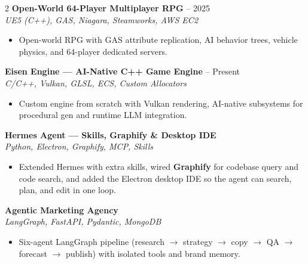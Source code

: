 \documentclass[10pt,a4paper]{article}
\begin{document}
\begin{paracol}{2}
\textbf{Open-World 64-Player Multiplayer RPG}
    \hfill {\color{subtext}\fontsize{7.5}{9} -- 2025}\\
{\fontsize{7.5}{9}\selectfont\textit{UE5 (C++), GAS, Niagara,
Steamworks, AWS EC2}}
\begin{itemize}
    \item Open-world RPG with GAS attribute replication, AI behavior
        trees, vehicle physics, and 64-player dedicated servers.
\end{itemize}

\vspace{1pt}

\textbf{Eisen Engine --- AI-Native C++ Game Engine}
    \hfill {\color{subtext}\fontsize{7.5}{9} -- Present}\\
{\fontsize{7.5}{9}\selectfont\textit{C/C++, Vulkan, GLSL, ECS,
Custom Allocators}}
\begin{itemize}
    \item Custom engine from scratch with Vulkan rendering, AI-native
        subsystems for procedural gen and runtime LLM integration.
\end{itemize}

\vspace{1pt}

\textbf{Hermes Agent --- Skills, Graphify \& Desktop IDE}
    \hfill {\color{subtext}\fontsize{7.5}{9}}\\
{\fontsize{7.5}{9}\selectfont\textit{Python, Electron, Graphify,
MCP, Skills}}
\begin{itemize}
    \item Extended Hermes with extra skills, wired \textbf{Graphify}
        for codebase query and code search, and added the Electron
        desktop IDE so the agent can search, plan, and edit in one loop.
\end{itemize}

\vspace{1pt}

\textbf{Agentic Marketing Agency}
    \hfill {\color{subtext}\fontsize{7.5}{9}}\\
{\fontsize{7.5}{9}\selectfont\textit{LangGraph, FastAPI, Pydantic,
MongoDB}}
\begin{itemize}
    \item Six-agent LangGraph pipeline (research $\rightarrow$ strategy
        $\rightarrow$ copy $\rightarrow$ QA $\rightarrow$ forecast
        $\rightarrow$ publish) with isolated tools and brand memory.
\end{itemize}


\end{paracol}
\end{document}

